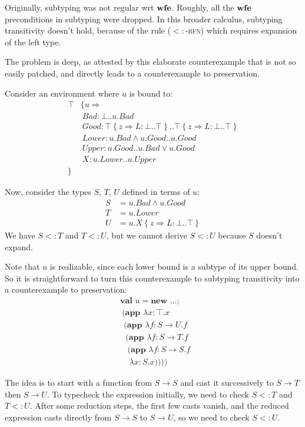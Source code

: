 \documentclass[9pt]{sigplanconf}
\newcommand{\sub}{<:}
\newcommand{\nswfe}{\mbox{\textbf{wfe}}}
\newcommand{\tfun}{\rightarrow}
\newcommand{\tand}{\wedge}
\newcommand{\tor}{\vee}
\newcommand{\refine}[2]{\left\{#1 \Rightarrow #2 \right\}}
\newcommand{\mlrefine}[2]{\{#1 \Rightarrow #2 \}}
\newcommand{\abs}[3]{\lambda #1\!:\!#2.#3}
\newcommand{\mlnew}[3]{\textbf{val }#1 = \textbf{new }#2 ;\;\\&#3}
\newcommand{\Ldecl}[3]{#1 : #2..#3}%
\newcommand{\Top}{\top}%
\newcommand{\Bot}{\bot}%
\newcommand{\mlapp}[2]{(\textbf{app }#1\;\\&#2)}
\begin{document}
Originally, subtyping was not regular wrt $\nswfe$. Roughly,
all the $\nswfe$ preconditions in subtyping were dropped. In this
broader calculus, subtyping transitivity doesn't hold, because of the
rule (\textsc{$\sub$-rfn}) which requires expansion of the left type.

The problem is deep, as attested by this elaborate counterexample
that is not so easily patched, and directly leads to a counterexample
to preservation.

Consider an environment where $u$ is bound to:
\begin{align*}
\Top & \mlrefine u {\\
&\ \Ldecl {\mathit{Bad}} {\Bot} {u.\mathit{Bad}}\\
&\ \Ldecl {\mathit{Good}} {\Top \refine z {\Ldecl L \Bot \Top}} {\Top \refine z {\Ldecl L \Bot \Top}}\\
&\ \Ldecl {\mathit{Lower}} {u.\mathit{Bad} \tand u.\mathit{Good}} {u.\mathit{Good}}\\
&\ \Ldecl {\mathit{Upper}} {u.\mathit{Good}} {u.\mathit{Bad} \tor u.\mathit{Good}}\\
&\ \Ldecl X {u.\mathit{Lower}} {u.\mathit{Upper}}\\
}&
\end{align*}

Now, consider the types $S$, $T$, $U$ defined in terms of $u$:
\begin{align*}
S &= u.\mathit{Bad} \tand u.\mathit{Good}\\
T &= u.\mathit{Lower}\\
U &= u.X \refine z {\Ldecl L \Bot \Top}
\end{align*}
We have $S \sub T$ and $T \sub U$, but we cannot derive $S \sub U$ because
$S$ doesn't expand.

Note that $u$ is realizable, since each lower bound is a subtype of
its upper bound. So it is straightforward to turn this counterexample
to subtyping transitivity into a counterexample to preservation:
\begin{align*}
&\mlnew u \ldots {
\ \mlapp{\abs x \Top x}{
\ \ \mlapp{\abs f {S \tfun U} f}{
\ \ \ \mlapp{\abs f {S \tfun T} f}{
\ \ \ \ \mlapp{\abs f {S \tfun S} f}{
\ \ \  \ \ \abs x S x}}}}}
\end{align*}

The idea is to start with a function from $S \tfun S$ and cast it
successively to $S \tfun T$ then $S \tfun U$. To typecheck the
expression initially, we need to check $S \sub T$ and $T \sub
U$. After some reduction steps, the first few casts vanish, and the
reduced expression casts directly from $S \tfun S$ to $S \tfun U$, so
we need to check $S \sub U$.
\end{document}
